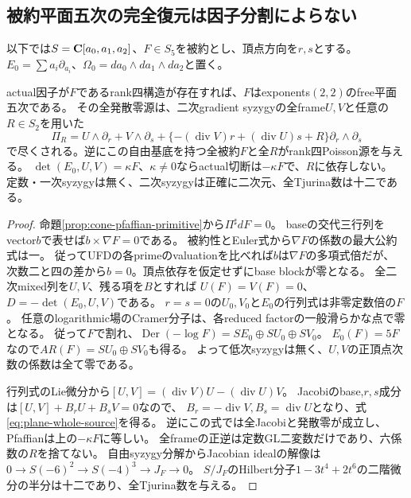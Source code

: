 \subsection{被約平面五次の完全復元は因子分割によらない}
以下では$S=\mathbf C[a_0,a_1,a_2]$、$F\in S_5$を被約とし、頂点方向を$r,s$とする。
$E_0=\sum a_i\partial_{a_i}$、$\Omega_0=da_0\wedge da_1\wedge da_2$と置く。
\begin{theorem}[全平面五次のSaito源]\label{thm:reduced-plane-whole-source}
actual因子が$F$であるrank四構造が存在すれば、$F$はexponents$(2,2)$のfree平面五次である。
その全発散零源は、二次gradient syzygyの全frame$U,V$と任意の$R\in S_2$を用いた
\begin{equation}
 \Pi_R=U\wedge\partial_r+V\wedge\partial_s+
 \{-(\operatorname{div}V)r+(\operatorname{div}U)s+R\}
       \partial_r\wedge\partial_s                         \label{eq:plane-whole-source}
\end{equation}
で尽くされる。逆にこの自由基底を持つ全被約$F$と全$R$がrank四Poisson源を与える。
$\det(E_0,U,V)=\kappa F$、$\kappa\ne0$ならactual切断は$-\kappa F$で、$R$に依存しない。
定数・一次syzygyは無く、二次syzygyは正確に二次元、全Tjurina数は十二である。
\end{theorem}
\begin{proof}
命題\ref{prop:cone-pfaffian-primitive}から$\Pi^\sharp dF=0$。
baseの交代三行列をvector$b$で表せば$b\times\nabla F=0$である。
被約性とEuler式から$\nabla F$の係数の最大公約式は一。
従ってUFDの各primeのvaluationを比べれば$b$は$\nabla F$の多項式倍だが、
次数二と四の差から$b=0$。頂点依存を仮定せずにbase blockが零となる。
全二次mixed列を$U,V$、残る項を$B$とすれば
$U(F)=V(F)=0$、$D=-\det(E_0,U,V)$である。
$r=s=0$の$U_0,V_0$と$E_0$の行列式は非零定数倍の$F$。
任意のlogarithmic場のCramer分子は、各reduced factorの一般滑らかな点で零となる。
従って$F$で割れ、$\operatorname{Der}(-\log F)=SE_0\oplus SU_0\oplus SV_0$。
$E_0(F)=5F$なので$AR(F)=SU_0\oplus SV_0$も得る。
よって低次syzygyは無く、$U,V$の正頂点次数の係数は全て零である。

行列式のLie微分から$[U,V]=(\operatorname{div}V)U-(\operatorname{div}U)V$。
Jacobiのbase,$r,s$成分は$[U,V]+B_rU+B_sV=0$なので、
$B_r=-\operatorname{div}V,B_s=\operatorname{div}U$となり、式\eqref{eq:plane-whole-source}を得る。
逆にこの式では全Jacobiと発散零が成立し、Pfaffianは上の$-\kappa F$に等しい。
全frameの正逆は定数GL二変数だけであり、六係数の$R$を捨てない。
自由syzygy分解からJacobian idealの解像は
$0\to S(-6)^2\to S(-4)^3\to J_F\to0$。
$S/J_F$のHilbert分子$1-3t^4+2t^6$の二階微分の半分は十二であり、全Tjurina数を与える。
\end{proof}

